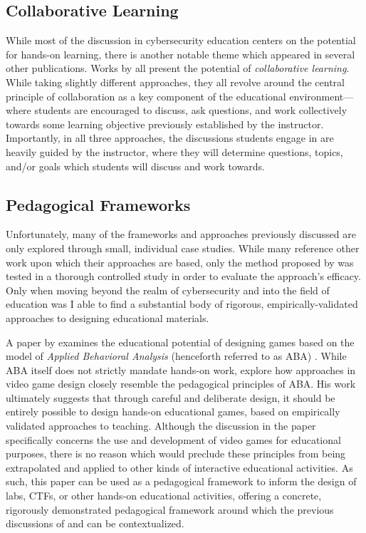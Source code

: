 \subsection{Collaborative Learning}

    While most of the discussion in cybersecurity education centers on the potential for hands-on learning, there is another notable theme which appeared in several other publications. %
Works by \textcite{P-Deshpande, C-Kussmaul,B-Payne} all present the potential of \emph{collaborative learning}. %
While taking slightly different approaches, they all revolve around the central principle of collaboration as a key component of the educational environment---%
where students are encouraged to discuss, ask questions, and work collectively towards some learning objective previously established by the instructor. %
Importantly, in all three approaches, the discussions students engage in are heavily guided by the instructor, where they will determine questions, topics, and/or goals which students will discuss and work towards. 


\subsection{Pedagogical Frameworks}

    Unfortunately, many of the frameworks and approaches previously discussed are only explored through small, individual case studies. %
While many reference other work upon which their approaches are based, only the method proposed by \citeauthor{P-Deshpande} was tested in a thorough controlled study in order to evaluate the approach's efficacy. %
Only when moving beyond the realm of cybersecurity and into the field of education was I able to find a substantial body of rigorous, empirically-validated approaches to designing educational materials. 

    A paper by \citeauthor{C-Linehan} examines the educational potential of designing games based on the model of \emph{Applied Behavioral Analysis} (henceforth referred to as ABA) \cite{C-Linehan}. %
While ABA itself does not strictly mandate hands-on work, \citeauthor{C-Linehan} explore how approaches in video game design closely resemble the pedagogical principles of ABA. His work ultimately suggests that through careful and deliberate design, it should be entirely possible to design hands-on educational games, based on empirically validated approaches to teaching. %
Although the discussion in the paper specifically concerns the use and development of video games for educational purposes, there is no reason which would preclude these principles from being extrapolated and applied to other kinds of interactive educational activities. %
As such, this paper can be used as a pedagogical framework to inform the design of labs, CTFs, or other hands-on educational activities, offering a concrete, rigorously demonstrated pedagogical framework around which the previous discussions of \citeauthor{J-Sweller} and \citeauthor{R-Weiss} can be contextualized. 


